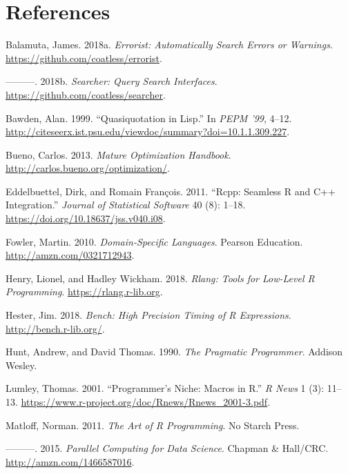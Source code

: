 \documentclass[]{book}
\begin{document}
\hypertarget{references}{%
\chapter*{References}\label{references}}

\hypertarget{refs}{}
\leavevmode\hypertarget{ref-errorist}{}%
Balamuta, James. 2018a. \emph{Errorist: Automatically Search Errors or Warnings}. \url{https://github.com/coatless/errorist}.

\leavevmode\hypertarget{ref-searcher}{}%
---------. 2018b. \emph{Searcher: Query Search Interfaces}. \url{https://github.com/coatless/searcher}.

\leavevmode\hypertarget{ref-bawden-1999}{}%
Bawden, Alan. 1999. ``Quasiquotation in Lisp.'' In \emph{PEPM '99}, 4--12. \url{http://citeseerx.ist.psu.edu/viewdoc/summary?doi=10.1.1.309.227}.

\leavevmode\hypertarget{ref-mature-opt}{}%
Bueno, Carlos. 2013. \emph{Mature Optimization Handbook}. \url{http://carlos.bueno.org/optimization/}.

\leavevmode\hypertarget{ref-Rcpp}{}%
Eddelbuettel, Dirk, and Romain François. 2011. ``Rcpp: Seamless R and C++ Integration.'' \emph{Journal of Statistical Software} 40 (8): 1--18. \url{https://doi.org/10.18637/jss.v040.i08}.

\leavevmode\hypertarget{ref-dsls}{}%
Fowler, Martin. 2010. \emph{Domain-Specific Languages}. Pearson Education. \url{http://amzn.com/0321712943}.

\leavevmode\hypertarget{ref-rlang}{}%
Henry, Lionel, and Hadley Wickham. 2018. \emph{Rlang: Tools for Low-Level R Programming}. \url{https://rlang.r-lib.org}.

\leavevmode\hypertarget{ref-bench}{}%
Hester, Jim. 2018. \emph{Bench: High Precision Timing of R Expressions}. \url{http://bench.r-lib.org/}.

\leavevmode\hypertarget{ref-pragprog}{}%
Hunt, Andrew, and David Thomas. 1990. \emph{The Pragmatic Programmer}. Addison Wesley.

\leavevmode\hypertarget{ref-lumley-2001}{}%
Lumley, Thomas. 2001. ``Programmer's Niche: Macros in R.'' \emph{R News} 1 (3): 11--13. \url{https://www.r-project.org/doc/Rnews/Rnews_2001-3.pdf}.

\leavevmode\hypertarget{ref-art-r-prog}{}%
Matloff, Norman. 2011. \emph{The Art of R Programming}. No Starch Press.

\leavevmode\hypertarget{ref-parcomp-ds}{}%
---------. 2015. \emph{Parallel Computing for Data Science}. Chapman \& Hall/CRC. \url{http://amzn.com/1466587016}.
\end{document}

